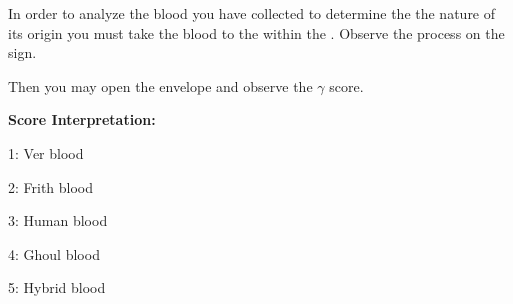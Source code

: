 \documentclass[green]{guildcamp4}
\begin{document}
\name{\gReadBlood{}}

In order to analyze the blood you have collected to determine the the nature of its origin you must take the blood to the \sBloodAnalyzer{} within the \pBioLabC{}. Observe the process on the sign.

Then you may open the \iTestTube{} envelope and observe the $\gamma$ score.

{\bf  Score Interpretation:}

1: Ver blood

2: Frith blood

3: Human blood

4: Ghoul blood

5: Hybrid blood
\end{document}
